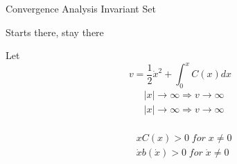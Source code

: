 \documentclass{beamer}
\begin{document}
\begin{frame}{Convergence Analysis}
Invariant Set\\
\begin{center}
Starts there, stay there\\
\end{center}
Let
$$v=\frac{1}{2}\dot{x}^2+\int_0^x C(x)dx$$
\vspace{-1cm}
\begin{align*}
    &|x| \rightarrow \infty \Rightarrow v \rightarrow \infty\\
    &|x| \rightarrow \infty \Rightarrow v \rightarrow \infty\\
\end{align*}

\begin{align*}
    &xC(x)>0\; for\; x \neq 0\\
    &\dot{x}b(\dot{x}) > 0\; for\; \dot{x} \neq 0
\end{align*}
\end{frame}
\end{document}
